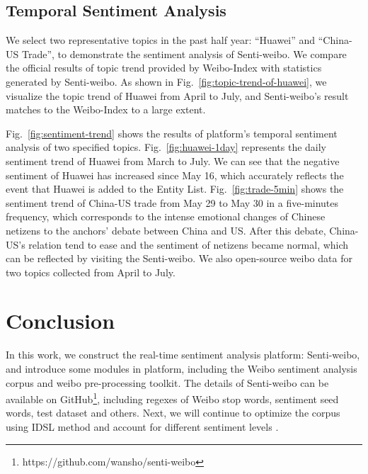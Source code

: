 \documentclass[runningheads]{llncs}
\begin{document}
\subsection{Temporal Sentiment Analysis}

We select two representative topics in the past half year: ``Huawei'' and ``China-US Trade'', to demonstrate the sentiment analysis of Senti-weibo. We compare the official results of topic trend provided by Weibo-Index with statistics generated by Senti-weibo. As shown in Fig.~\ref{fig:topic-trend-of-huawei}, we visualize the topic trend of Huawei from April to July, and Senti-weibo's result matches to the Weibo-Index to a large extent. 

Fig.~\ref{fig:sentiment-trend} shows the results of platform's temporal sentiment analysis of two specified topics. Fig.~\ref{fig:huawei-1day} represents the daily sentiment trend of Huawei from March to July. We can see that the negative sentiment of Huawei has increased since May 16, which accurately reflects the event that Huawei is added to the Entity List. Fig.~\ref{fig:trade-5min} shows the sentiment trend of China-US trade from May 29 to May 30 in a five-minutes frequency, which corresponds to the intense emotional changes of Chinese netizens to the anchors' debate between China and US. After this debate, China-US's relation tend to ease and the sentiment of netizens became normal, which can be reflected by visiting the Senti-weibo. We also open-source weibo data for two topics collected from April to July.

\section{Conclusion}

In this work, we construct the real-time sentiment analysis platform: Senti-weibo, and introduce some modules in platform, including the Weibo sentiment analysis corpus and weibo pre-processing toolkit. The details of Senti-weibo can be available on GitHub\footnote{https://github.com/wansho/senti-weibo}, including regexes of Weibo stop words, sentiment seed words, test dataset and others. Next, we will continue to optimize the corpus using IDSL method and account for different sentiment levels \cite{le2017ontology}.


%
%
%


\end{document}
